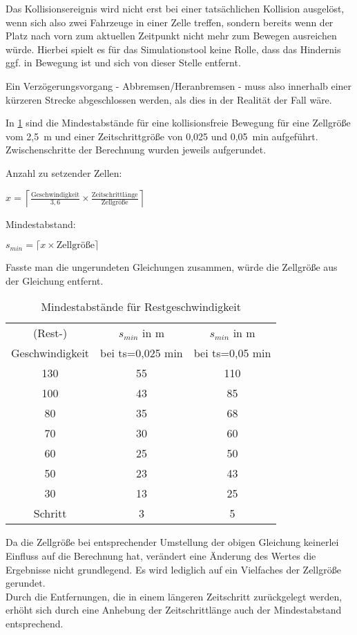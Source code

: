 Das Kollisionsereignis wird nicht erst bei einer tatsächlichen Kollision ausgelöst, wenn sich also zwei Fahrzeuge in einer Zelle treffen, sondern bereits wenn der Platz nach vorn zum aktuellen Zeitpunkt nicht mehr zum Bewegen ausreichen würde.
Hierbei spielt es für das Simulationstool keine Rolle, dass das Hindernis ggf. in Bewegung ist und sich von dieser Stelle entfernt.

Ein Verzögerungsvorgang - Abbremsen/Heranbremsen - muss also innerhalb einer kürzeren Strecke abgeschlossen werden, als dies in der Realität der Fall wäre.

In \cref{tab:restgeschw-abstand} sind die Mindestabstände für eine kollisionsfreie Bewegung für eine Zellgröße vom \mbox{2,5 m} und einer Zeitschrittgröße von 0,025 und \mbox{0,05 min} aufgeführt.
Zwischenschritte der Berechnung wurden jeweils aufgerundet.

\noindent
Anzahl zu setzender Zellen:%
\begin{center}
$ x = \left\lceil \frac{\text{Geschwindigkeit}}{3,6} \times \frac{\text{Zeitschrittlänge}}{\text{Zellgröße}} \right\rceil $
\end{center}
Mindestabstand: 
\begin{center}
$ s_{min} = \lceil x \times \text{Zellgröße} \rceil $
\end{center}

Fasste man die ungerundeten Gleichungen zusammen, würde die Zellgröße aus der Gleichung entfernt.

\begin{table}[ht]
\begin{center}
\setlength{\tabcolsep}{0.5em} %
{\renewcommand{\arraystretch}{1.2}%
\begin{tabular}{| c  c  c |}
\hline 
(Rest-) & $ s_{min} $ in m & $ s_{min} $ in m  \\ 
Geschwindigkeit & bei ts=0,025 min & bei ts=0,05 min \\ \hline 
130 & 55 & 110 \\ 
100 & 43 & 85 \\ 
80 & 35 & 68 \\ 
70 & 30 & 60 \\ 
60 & 25 & 50 \\ 
50 & 23 & 43 \\ 
30 & 13 & 25 \\ 
Schritt & 3 & 5 \\ \hline
\end{tabular}
}
\caption{Mindestabstände für Restgeschwindigkeit}
\label{tab:restgeschw-abstand}
\end{center}
\end{table}

Da die Zellgröße bei entsprechender Umstellung der obigen Gleichung keinerlei Einfluss auf die Berechnung hat, verändert eine Änderung des Wertes die Ergebnisse nicht grundlegend. 
Es wird lediglich auf ein Vielfaches der Zellgröße gerundet.
\\
Durch die Entfernungen, die in einem längeren Zeitschritt zurückgelegt werden, erhöht sich durch eine Anhebung der Zeitschrittlänge auch der Mindestabstand entsprechend.
